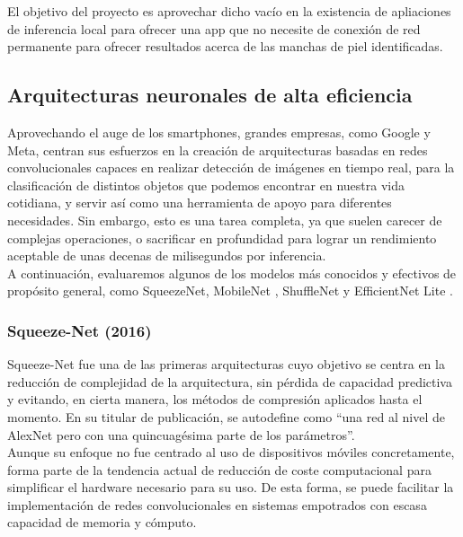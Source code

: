 El objetivo del proyecto es aprovechar dicho vacío en la existencia de apliaciones de inferencia local para ofrecer una app que no necesite de conexión de red permanente para ofrecer resultados acerca de las manchas de piel identificadas.

\subsection{Arquitecturas neuronales de alta eficiencia}

Aprovechando el auge de los smartphones, grandes empresas, como Google y Meta, centran sus esfuerzos en la creación de arquitecturas basadas en redes convolucionales capaces en realizar detección de imágenes en tiempo real, para la clasificación de distintos objetos que podemos encontrar en nuestra vida cotidiana, y servir así como una herramienta de apoyo para diferentes necesidades. Sin embargo, esto es una tarea completa, ya que suelen carecer de complejas operaciones, o sacrificar en profundidad para lograr un rendimiento aceptable de unas decenas de milisegundos por inferencia.\\

A continuación, evaluaremos algunos de los modelos más conocidos y efectivos de propósito general, como SqueezeNet\cite{iandola2016squeezenet}, MobileNet \cite{howard2017mobilenets}\cite{sandler2019mobilenetv2}\cite{howard2019searching}, ShuffleNet \cite{zhang2017shufflenet} y  EfficientNet Lite \cite{tan2020efficientnet}\cite{eflite}.

\subsubsection{Squeeze-Net (2016)}

Squeeze-Net fue una de las primeras arquitecturas cuyo objetivo se centra en la reducción de complejidad de la arquitectura, sin pérdida de capacidad predictiva y evitando, en cierta manera, los métodos de compresión aplicados hasta el momento. En su titular de publicación, se autodefine como ``una red al nivel de AlexNet pero con una quincuagésima parte de los parámetros''.\\

Aunque su enfoque no fue centrado al uso de dispositivos móviles concretamente, forma parte de la tendencia actual de reducción de coste computacional para simplificar el hardware necesario para su uso. De esta forma, se puede facilitar la implementación de redes convolucionales en sistemas empotrados con escasa capacidad de memoria y cómputo.\\

